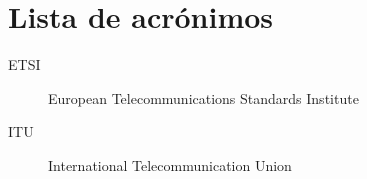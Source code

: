 \chapter*{Lista de acrónimos}

\begin{description}
	\item [ETSI] European Telecommunications Standards Institute
	\item [ITU] International Telecommunication Union
\end{description}